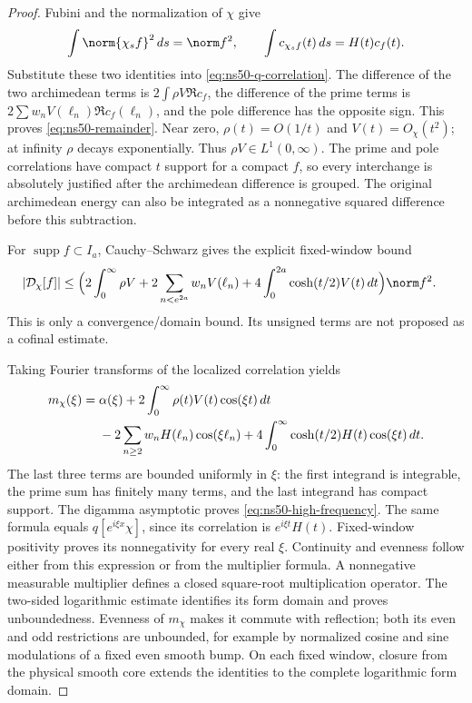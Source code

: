 \begin{proof}
Fubini and the normalization of $\chi$ give
\[
 \int\norm{\chi_s f}^2\,ds=\norm f^2,
 \qquad \int c_{\chi_s f}(t)\,ds=H(t)c_f(t).
\]
Substitute these two identities into
\eqref{eq:ns50-q-correlation}. The difference of the two
archimedean terms is $2\int\rho V\Re c_f$, the difference of the
prime terms is $2\sum w_nV(\ell_n)\Re c_f(\ell_n)$, and the pole
difference has the opposite sign. This proves
\eqref{eq:ns50-remainder}. Near zero, $\rho(t)=O(1/t)$ and
$V(t)=O_\chi(t^2)$; at infinity $\rho$ decays exponentially.
Thus $\rho V\in L^1(0,\infty)$. The prime and pole correlations
have compact $t$ support for a compact $f$, so every interchange is
absolutely justified after the archimedean difference is grouped.
The original archimedean energy can also be integrated as a
nonnegative squared difference before this subtraction.

For $\operatorname{supp}f\subset I_a$, Cauchy--Schwarz gives the
explicit fixed-window bound
\begin{align*}
 |\mathcal D_\chi[f]|\le\Bigl(&2\int_0^\infty\rho V
       +2\sum_{n<e^{2a}}w_nV(\ell_n)
       +4\int_0^{2a}\cosh(t/2)V(t)\,dt\Bigr)\norm f^2.
\end{align*}
This is only a convergence/domain bound. Its unsigned terms are not
proposed as a cofinal estimate.

Taking Fourier transforms of the localized correlation yields
\begin{align*}
 m_\chi(\xi)={}&\alpha(\xi)
       +2\int_0^\infty\rho(t)V(t)\cos(\xi t)\,dt\notag\\
 &-2\sum_{n\ge2}w_nH(\ell_n)\cos(\xi\ell_n)
       +4\int_0^\infty\cosh(t/2)H(t)\cos(\xi t)\,dt.
\end{align*}
The last three terms are bounded uniformly in $\xi$: the first
integrand is integrable, the prime sum has finitely many terms, and
the last integrand has compact support. The digamma asymptotic
proves \eqref{eq:ns50-high-frequency}. The same formula equals
$q[e^{i\xi x}\chi]$, since its correlation is $e^{i\xi t}H(t)$.
Fixed-window positivity proves its nonnegativity for every real
$\xi$. Continuity and evenness follow either from this expression
or from the multiplier formula. A nonnegative measurable multiplier
defines a closed square-root multiplication operator. The two-sided
logarithmic estimate identifies its form domain and proves
unboundedness. Evenness of $m_\chi$ makes it commute with reflection;
both its even and odd restrictions are unbounded, for example by
normalized cosine and sine modulations of a fixed even smooth bump.
On each fixed window, closure from the physical smooth core extends
the identities to the complete logarithmic form domain.
\end{proof}

